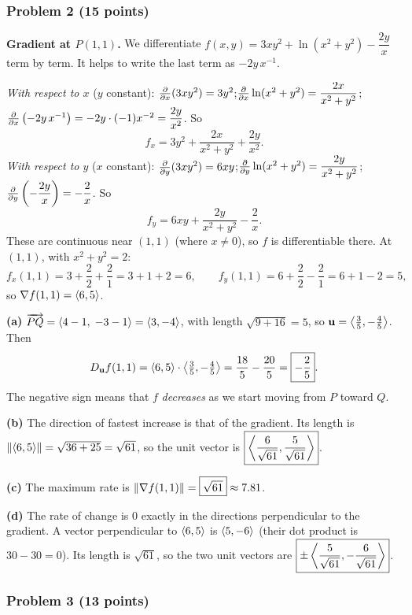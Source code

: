 \subsubsection*{Problem 2 (15 points)}

\textbf{Gradient at $P(1,1)$.} We differentiate
$f(x,y)=3xy^2+\ln(x^2+y^2)-\dfrac{2y}{x}$ term by term. It helps to write the last
term as $-2y\,x^{-1}$.

\emph{With respect to $x$} ($y$ constant):
$\frac{\partial }{\partial x}(3xy^2)=3y^2$;\quad $\frac{\partial }{\partial x}\ln(x^2+y^2)=\dfrac{2x}{x^2+y^2}$;\quad
$\frac{\partial }{\partial x}\left(-2y\,x^{-1}\right)=-2y\cdot(-1)x^{-2}=\dfrac{2y}{x^2}$. So
\[
  f_x=3y^2+\frac{2x}{x^2+y^2}+\frac{2y}{x^2}.
\]
\emph{With respect to $y$} ($x$ constant):
$\frac{\partial }{\partial y}(3xy^2)=6xy$;\quad $\frac{\partial }{\partial y}\ln(x^2+y^2)=\dfrac{2y}{x^2+y^2}$;\quad
$\frac{\partial }{\partial y}\left(-\dfrac{2y}{x}\right)=-\dfrac{2}{x}$. So
\[
  f_y=6xy+\frac{2y}{x^2+y^2}-\frac2x .
\]
These are continuous near $(1,1)$ (where $x\neq0$), so $f$ is differentiable there.
At $(1,1)$, with $x^2+y^2=2$:
\[
  f_x(1,1)=3+\frac22+\frac21=3+1+2=6,\qquad f_y(1,1)=6+\frac22-\frac21=6+1-2=5,
\]
so $\nabla f(1,1)=\left\langle 6,5 \right\rangle$.

\textbf{(a)} $\overrightarrow{PQ}=\left\langle 4-1,\;-3-1 \right\rangle=\left\langle 3,-4 \right\rangle$, with length $\sqrt{9+16}=5$, so
$\mathbf{u}=\left\langle \frac35,-\frac45 \right\rangle$. Then
\[
  D_{\mathbf{u}} f(1,1)=\left\langle 6,5 \right\rangle\cdot\left\langle \tfrac35,-\tfrac45 \right\rangle=\frac{18}{5}-\frac{20}{5}=\boxed{-\frac25}.
\]
The negative sign means that $f$ \emph{decreases} as we start moving from $P$ toward $Q$.

\textbf{(b)} The direction of fastest increase is that of the gradient. Its length is
$\lVert\left\langle 6,5 \right\rangle\rVert=\sqrt{36+25}=\sqrt{61}$, so the unit vector is
$\boxed{\left\langle \frac{6}{\sqrt{61}},\frac{5}{\sqrt{61}} \right\rangle}$.

\textbf{(c)} The maximum rate is $\lVert\nabla f(1,1)\rVert=\boxed{\sqrt{61}}\approx7.81$.

\textbf{(d)} The rate of change is $0$ exactly in the directions perpendicular to the
gradient. A vector perpendicular to $\left\langle 6,5 \right\rangle$ is $\left\langle 5,-6 \right\rangle$ (their dot product is
$30-30=0$). Its length is $\sqrt{61}$, so the two unit vectors are
$\boxed{\pm\left\langle \frac{5}{\sqrt{61}},-\frac{6}{\sqrt{61}} \right\rangle}$.

\subsubsection*{Problem 3 (13 points)}

